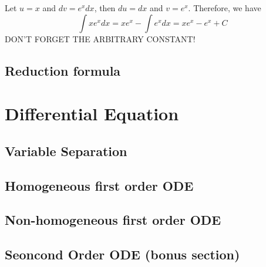 \documentclass{article}
\theoremstyle{definition}
\theoremstyle{definition}
\theoremstyle{definition}
\theoremstyle{definition}
\theoremstyle{definition}
\theoremstyle{definition}
\theoremstyle{definition}
\theoremstyle{definition}
\theoremstyle{definition}
\begin{document}
Let $u=x$ and $dv= e^xdx$, then $du=dx$ and $v=e^x$. Therefore, we have
\[
\int xe^xdx=xe^x-\int e^xdx=xe^x-e^x+C
\]
DON'T FORGET THE ARBITRARY CONSTANT!
\subsection{Reduction formula}

\section{Differential Equation}
\subsection{Variable Separation}
\subsection{Homogeneous first order ODE}
\subsection{Non-homogeneous first order ODE}
\subsection{Seoncond Order ODE (bonus section)}
\end{document}

